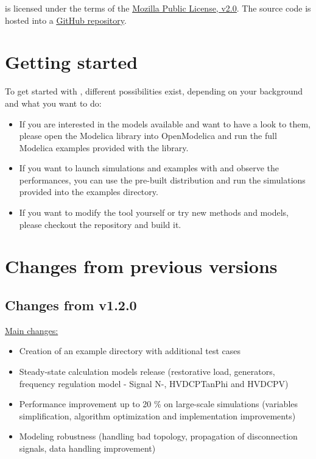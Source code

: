 \documentclass[a4paper, 12pt]{report}
\begin{document}
\Dynawo is licensed under the terms of the \href{http://mozilla.org/MPL/2.0}{\underline{Mozilla Public License, v2.0}}.
The source code is hosted into a \href{https://github.com/dynawo/dynawo} {\underline{GitHub repository}}. \\

\section{Getting started}

To get started with \Dynawo , different possibilities exist, depending on your background and what you want to do:
\begin{itemize}
\item If you are interested in the models available and want to have a look to them, please open the \Dynawo Modelica library into OpenModelica and run the full Modelica examples provided with the library.
\item If you want to launch simulations and examples with \Dynawo and observe the performances, you can use the pre-built distribution and run the simulations provided into the examples directory.
\item If you want to modify the tool yourself or try new methods and models, please checkout the repository and build it.
\end{itemize}

\section{Changes from previous versions}

\subsection{Changes from v1.2.0}

\underline{Main changes:}
\begin{itemize}
\item Creation of an example directory with additional test cases
\item Steady-state calculation models release (restorative load, generators, frequency regulation model - Signal N-, HVDCPTanPhi and HVDCPV)
\item Performance improvement up to 20 \% on large-scale simulations (variables simplification, algorithm optimization and implementation improvements)
\item Modeling robustness (handling bad topology, propagation of disconnection signals, data handling improvement)
\end{itemize}
\end{document}
